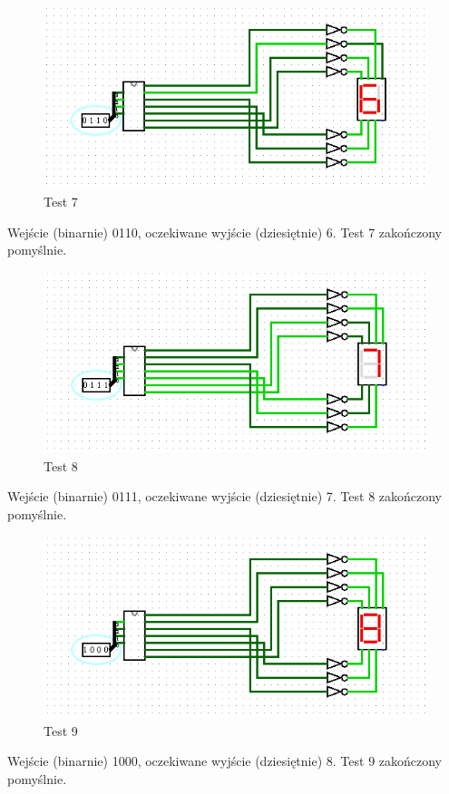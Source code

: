 \begin{figure}[H]
    \includegraphics[width=\linewidth]{ScreenshotsTests/Comp 1/Comp 1_00003.png}
    \caption{Test 7}
    \label{fig:test6}
\end{figure}
Wejście (binarnie) 0110, oczekiwane wyjście (dziesiętnie) 6.\newline
Test 7 zakończony pomyślnie.

\begin{figure}[H]
    \includegraphics[width=\linewidth]{ScreenshotsTests/Comp 1/Comp 1_00002.png}
    \caption{Test 8}
    \label{fig:test7}
\end{figure}
Wejście (binarnie) 0111, oczekiwane wyjście (dziesiętnie) 7.\newline
Test 8 zakończony pomyślnie.

\begin{figure}[H]
    \includegraphics[width=\linewidth]{ScreenshotsTests/Comp 1/Comp 1_00001.png}
    \caption{Test 9}
    \label{fig:test8}
\end{figure}
Wejście (binarnie) 1000, oczekiwane wyjście (dziesiętnie) 8.\newline
Test 9 zakończony pomyślnie.

